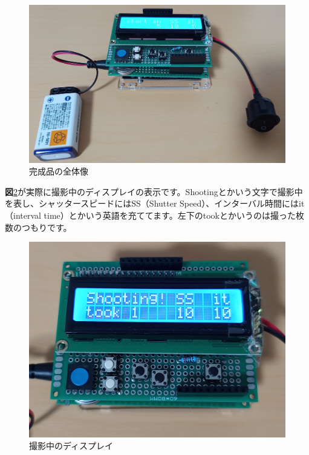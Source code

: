 \documentclass[../main]{subfiles}
\begin{document}
\begin{figure}
    \centering
    \includegraphics[width=0.5\linewidth]{sections/Maruyama/figure/zentai.jpg}
    \caption{完成品の全体像}
    \label{kansei}
\end{figure}
\textbf{図}\ref{jikkou}が実際に撮影中のディスプレイの表示です。Shootingとかいう文字で撮影中を表し、シャッタースピードにはSS（Shutter Speed）、インターバル時間にはit（interval time）とかいう英語を充ててます。左下のtookとかいうのは撮った枚数のつもりです。

\begin{figure}
    \centering
    \includegraphics[width=0.5\linewidth]{sections/Maruyama/figure/jikkou.jpg}
    \caption{撮影中のディスプレイ}
    \label{jikkou}
\end{figure}
\end{document}
